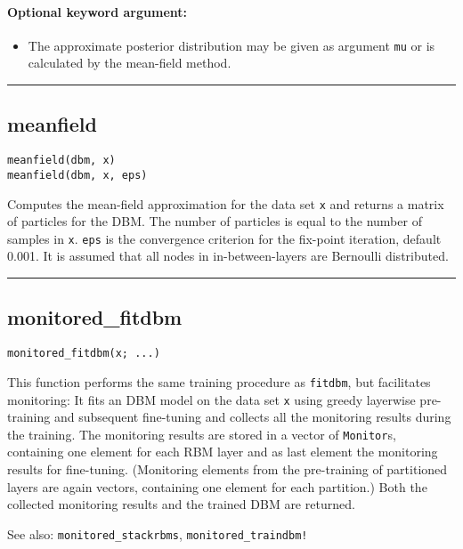\paragraph*{Optional keyword argument:}
\begin{itemize}
\item The approximate posterior distribution may be given as argument \texttt{mu} or is calculated by the mean-field method.

\end{itemize}
\noindent\rule{\textwidth}{1pt}
\subsection*{meanfield}
\begin{verbatim}
meanfield(dbm, x)
meanfield(dbm, x, eps)
\end{verbatim}
Computes the mean-field approximation for the data set \texttt{x} and returns a matrix of particles for the DBM. The number of particles is equal to the number of samples in \texttt{x}. \texttt{eps} is the convergence criterion for the fix-point iteration, default 0.001. It is assumed that all nodes in in-between-layers are Bernoulli distributed.

\noindent\rule{\textwidth}{1pt}
\subsection*{monitored\_fitdbm}
\begin{verbatim}
monitored_fitdbm(x; ...)
\end{verbatim}
This function performs the same training procedure as \texttt{fitdbm}, but facilitates monitoring: It fits an DBM model on the data set \texttt{x} using greedy layerwise pre-training and subsequent fine-tuning and collects all the monitoring results during the training. The monitoring results are stored in a vector of \texttt{Monitor}s, containing one element for each RBM layer and as last element the monitoring results for fine-tuning. (Monitoring elements from the pre-training of partitioned layers are again vectors, containing one element for each partition.) Both the collected monitoring results and the trained DBM are returned.

See also: \texttt{monitored\_stackrbms}, \texttt{monitored\_traindbm!}

